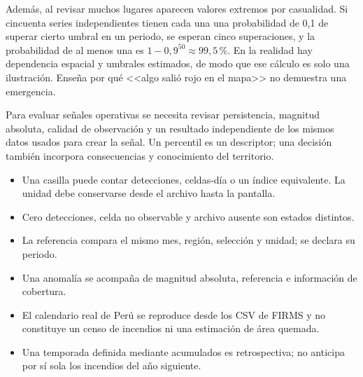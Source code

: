 Además, al revisar muchos lugares aparecen valores extremos por casualidad. Si cincuenta
series independientes tienen cada una una probabilidad de 0,1 de superar cierto umbral
en un periodo, se esperan cinco superaciones, y la probabilidad de al menos una es
$1-0{,}9^{50}\approx99{,}5\,{}\%$. En la realidad hay dependencia espacial y umbrales
estimados, de modo que ese cálculo es solo una ilustración. Enseña por qué <<algo salió
rojo en el mapa>> no demuestra una emergencia.

Para evaluar señales operativas se necesita revisar persistencia, magnitud absoluta,
calidad de observación y un resultado independiente de los mismos datos usados para
crear la señal. Un percentil es un descriptor; una decisión también incorpora consecuencias
y conocimiento del territorio.

\resumen
\begin{itemize}
\item Una casilla puede contar detecciones, celdas-día o un índice equivalente. La unidad
debe conservarse desde el archivo hasta la pantalla.
\item Cero detecciones, celda no observable y archivo ausente son estados distintos.
\item La referencia compara el mismo mes, región, selección y unidad; se declara su periodo.
\item Una anomalía se acompaña de magnitud absoluta, referencia e información de cobertura.
\item El calendario real de Perú se reproduce desde los CSV de FIRMS y no constituye un
censo de incendios ni una estimación de área quemada.
\item Una temporada definida mediante acumulados es retrospectiva; no anticipa por sí sola
los incendios del año siguiente.
\end{itemize}

